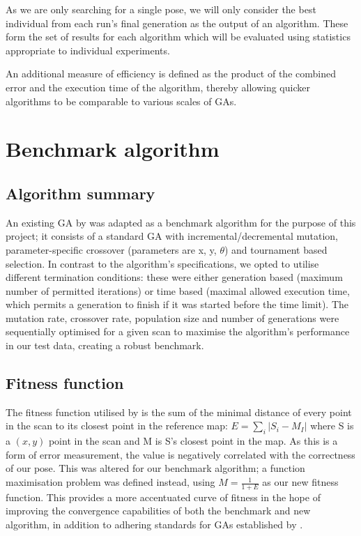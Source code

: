 \documentclass[authoryearcitations]{UoYCSproject}
\begin{document}
As we are only searching for a single pose, we will only consider the best individual from each run's final generation as the output of an algorithm. These form the set of results for each algorithm which will be evaluated using statistics appropriate to individual experiments. \newline

An additional measure of efficiency is defined as the product of the combined error and the execution time of the algorithm, thereby allowing quicker algorithms to be comparable to various scales of GAs.

\chapter{Benchmark algorithm}
\section{Algorithm summary}
An existing GA by \citet{Robertson2002-ou} was adapted as a benchmark algorithm for the purpose of this project; it consists of a standard GA with incremental/decremental mutation, parameter-specific crossover (parameters are x, y, $\theta$) and tournament based selection. In contrast to the algorithm's specifications, we opted to utilise different termination conditions: these were either generation based (maximum number of permitted iterations) or time based (maximal allowed execution time, which permits a generation to finish if it was started before the time limit). The mutation rate, crossover rate, population size and number of generations were sequentially optimised for a given scan to maximise the algorithm's performance in our test data, creating a robust benchmark.

\section{Fitness function}
\label{sec:fitness_landscape}
The fitness function utilised by \citet{Robertson2002-ou} is the sum of the minimal distance of every point in the scan to its closest point in the reference map: $E = \sum_i |S_i-M_I|$ where S is a $(x,y)$ point in the scan and M is S's closest point in the map. As this is a form of error measurement, the value is negatively correlated with the correctness of our pose. This was altered for our benchmark algorithm; a function maximisation problem was defined instead, using $M = \frac{1}{1+E}$ as our new fitness function. This provides a more accentuated curve of fitness in the hope of improving the convergence capabilities of both the benchmark and new algorithm, in addition to adhering standards for GAs established by \citet{Eiben2015-de}. \newline
\end{document}
